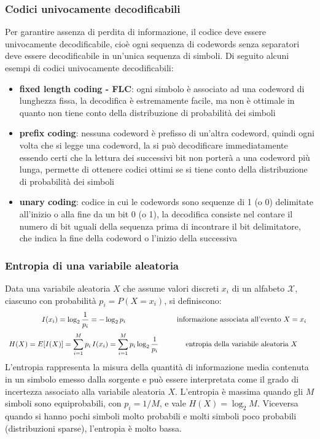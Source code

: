 \subsubsection*{Codici univocamente decodificabili}
Per garantire assenza di perdita di informazione, il codice deve essere univocamente decodificabile, cioè ogni sequenza di
codewords senza separatori deve essere decodificabile in un'unica sequenza di simboli. Di seguito alcuni esempi di codici
univocamente decodificabili:
\begin{itemize}
	\item \textbf{fixed length coding - FLC}: ogni simbolo è associato ad una codeword di lunghezza fissa, la decodifica è
	estremamente facile, ma non è ottimale in quanto non tiene conto della distribuzione di probabilità dei simboli
	\item \textbf{prefix coding}: nessuna codeword è prefisso di un'altra codeword, quindi ogni volta che si legge una codeword,
	la si può decodificare immediatamente essendo certi che la lettura dei successivi bit non porterà a una codeword più lunga,
	permette di ottenere codici ottimi se si tiene conto della distribuzione di probabilità dei simboli
	\item \textbf{unary coding}: codice in cui le codewords sono sequenze di 1 (o 0) delimitate all'inizio o alla fine da un bit 0
	(o 1), la decodifica consiste nel contare il numero di bit uguali della sequenza prima di incontrare il bit delimitatore,
	che indica la fine della codeword o l'inizio della successiva
\end{itemize}

\subsubsection*{Entropia di una variabile aleatoria}
Data una variabile aleatoria \(X\) che assume valori discreti \(x_i\) di un alfabeto \(\mathcal{X}\), ciascuno con probabilità
\(p_i = P(X=x_i)\), si definiscono:
\[\begin{array}{c c}
	\displaystyle I(x_i) = \log_2 \frac{1}{p_i} = - \log_2 p_i
	& \quad \begin{array}{c}
		\text{informazione associata all'evento } X=x_i
	\end{array}
	\\[12pt]
	\displaystyle H(X) = E[I(X)] = \sum_{i=1}^{M} p_i \, I(x_i) = \sum_{i=1}^{M} p_i \log_2 \frac{1}{p_i}
	& \quad \begin{array}{c}
		\text{entropia della variabile aleatoria } X
	\end{array}
\end{array}\]
L'entropia rappresenta la misura della quantità di informazione media contenuta in un simbolo emesso dalla sorgente e
può essere interpretata come il grado di incertezza associato alla variabile aleatoria \(X\). L'entropia è massima quando
gli \(M\) simboli sono equiprobabili, con \(p_i = 1/M\), e vale \(H(X) = \log_2 M\). Viceversa quando si hanno pochi simboli
molto probabili e molti simboli poco probabili (distribuzioni sparse), l'entropia è molto bassa.

